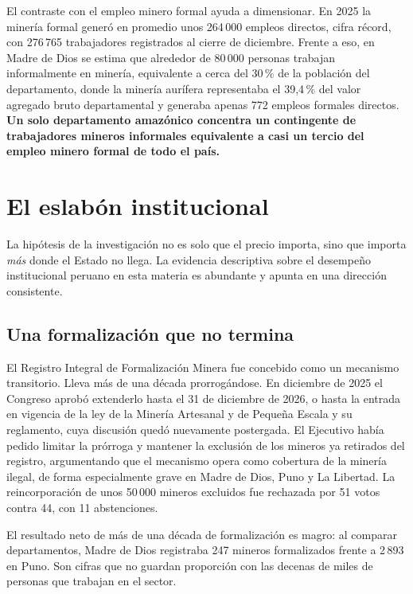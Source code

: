 \documentclass[11pt,a4paper]{article}
\begin{document}
El contraste con el empleo minero formal ayuda a dimensionar. En 2025 la minería formal generó en promedio unos 264\,000 empleos directos, cifra récord, con 276\,765 trabajadores registrados al cierre de diciembre. Frente a eso, en Madre de Dios se estima que alrededor de 80\,000 personas trabajan informalmente en minería, equivalente a cerca del 30\,\% de la población del departamento, donde la minería aurífera representaba el 39{,}4\,\% del valor agregado bruto departamental y generaba apenas 772 empleos formales directos. \textbf{Un solo departamento amazónico concentra un contingente de trabajadores mineros informales equivalente a casi un tercio del empleo minero formal de todo el país.}

\section{El eslabón institucional}

La hipótesis de la investigación no es solo que el precio importa, sino que importa \emph{más} donde el Estado no llega. La evidencia descriptiva sobre el desempeño institucional peruano en esta materia es abundante y apunta en una dirección consistente.

\subsection{Una formalización que no termina}

El Registro Integral de Formalización Minera fue concebido como un mecanismo transitorio. Lleva más de una década prorrogándose. En diciembre de 2025 el Congreso aprobó extenderlo hasta el 31 de diciembre de 2026, o hasta la entrada en vigencia de la ley de la Minería Artesanal y de Pequeña Escala y su reglamento, cuya discusión quedó nuevamente postergada. El Ejecutivo había pedido limitar la prórroga y mantener la exclusión de los mineros ya retirados del registro, argumentando que el mecanismo opera como cobertura de la minería ilegal, de forma especialmente grave en Madre de Dios, Puno y La Libertad. La reincorporación de unos 50\,000 mineros excluidos fue rechazada por 51 votos contra 44, con 11 abstenciones.

El resultado neto de más de una década de formalización es magro: al comparar departamentos, Madre de Dios registraba 247 mineros formalizados frente a 2\,893 en Puno. Son cifras que no guardan proporción con las decenas de miles de personas que trabajan en el sector.
\end{document}
